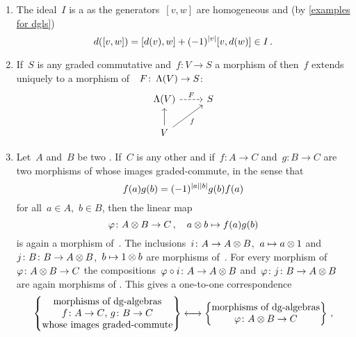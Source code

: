 \begin{enumerate}
  \item
    The ideal~$I$ is a {\dgi} as the generators~$[v,w]$ are homogeneous and (by \cref{examples for dgls})
    \[
      d([v,w])
      =
      [d(v), w] + (-1)^{\lvert v\rvert} [v, d(w)]
      \in
      I \,.
    \]
  \item
    If~$S$ is any graded commutative {\dga} and~$f \colon V \to S$ a morphism of {\dgvs} then~$f$ extends uniquely to a morphism of~{\dgas}~$F \colon \operatorname{\Lambda}(V) \to S$:
    \[
      \begin{tikzcd}
        \dgSymm(V)
        \arrow[dashed]{r}[above]{F}
        &
        S
        \\
        V
        \arrow{u}
        \arrow{ur}[below right]{f}
        &
        {}
      \end{tikzcd}
    \]
  \item
    Let~$A$ and~$B$ be two {\dgas}.
    If~$C$ is any other {\dga} and if~$f \colon A \to C$ and~$g \colon B \to C$ are two morphisms of {\dgas} whose images graded-commute, in the sense that
    \[
      f(a) g(b)
      =
      (-1)^{\lvert a\rvert \lvert b\rvert} g(b) f(a)
    \]
    for all~$a \in A$,~$b \in B$, then the linear map
    \[
      \varphi
      \colon
      A \otimes B
      \to
      C \,,
      \quad
      a \otimes b
      \mapsto
      f(a) g(b)
    \]
    is again a morphism of~{\dgas}.
    The inclusions~$i \colon A \to A \otimes B$,~$a \mapsto a \otimes 1$ and~$j \colon B \colon B \to A \otimes B$,~$b \mapsto 1 \otimes b$ are morphisms of~{\dgas}.
    For every morphism of {\dgas}~$\varphi \colon A \otimes B \to C$ the compositions~$\varphi \circ i \colon A \to A \otimes B$ and~$\varphi \colon j \colon B \to A \otimes B$ are again morphisms of {\dgas}.
    This gives a one-to-one correspondence
    \begin{align*}
      \left\{
        \begin{tabular}{@{}c@{}}
          morphisms of {\dgas} \\
          $f \colon A \to C$,~$g \colon B \to C$ \\
          whose images graded-commute
        \end{tabular}
      \right\}
      &\longonetoone
      \left\{
        \begin{tabular}{@{}c@{}}
          morphisms of {\dgas} \\
          $\varphi \colon A \tensor B \to C$
        \end{tabular}
      \right\} \,,
      \\

\end{align*}
\end{enumerate}
